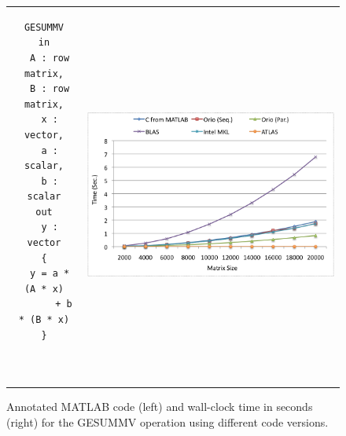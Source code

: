 \documentclass[11pt]{article}
\begin{document}
\begin{figure}[htp]
\centering
\begin{tabular}{cc}
\begin{minipage}[b]{.3\textwidth}
\footnotesize
\begin{verbatim}
GESUMMV
in
  A : row matrix,
  B : row matrix,
  x : vector,
  a : scalar,
  b : scalar
out
  y : vector
{
  y = a * (A * x)
       + b * (B * x)
}



\end{verbatim}
\end{minipage}
&
\begin{minipage}[b]{.6\textwidth}
\includegraphics[width=\textwidth]{figures/gesummv.png}
\end{minipage}\\
\end{tabular}
\caption{Annotated MATLAB code (left) and wall-clock time in seconds (right) for the GESUMMV operation using different code versions.}
\label{fig:gesummv}
\end{figure}


%
\end{document}
